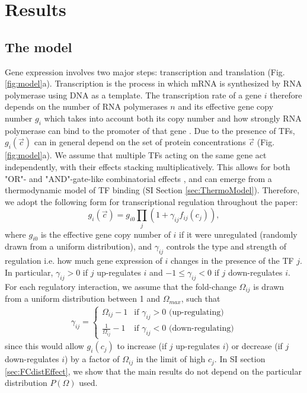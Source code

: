 \documentclass[10pt]{article}
\begin{document}
     

\section*{Results}

\subsection*{The model}
Gene expression involves two major steps: transcription and translation (Fig.\ref{fig:model}a). Transcription is the process in which mRNA is synthesized by RNA polymerase using DNA as a template. The transcription rate of a gene $i$ therefore depends on the number of RNA polymerases $n$ and its effective gene copy number $g_i$ which takes into account both its copy number and how strongly RNA polymerase can bind to the promoter of that gene \cite{lin2018homeostasis}. Due to the presence of TFs, $g_i(\vec{c})$ can in general depend on the set of protein concentrations $\vec{c}$ (Fig.\ref{fig:model}a). We assume that multiple TFs acting on the same gene act independently, with their effects stacking multiplicatively. This allows for both "OR"- and "AND"-gate-like combinatorial effects \cite{buchler2003schemes}, and can emerge from a thermodynamic model of TF binding (SI Section \ref{sec:ThermoModel}). Therefore, we adopt the following form for
transcriptional regulation throughout the paper:  
\begin{equation}
g_i(\vec{c}) = g_{i0} \prod_j (1 + \gamma_{ij} f_{ij}(c_j)),
\label{eqn:giexpression}
\end{equation}
where $g_{i0}$ is the effective gene copy number of $i$ if it were unregulated (randomly drawn from a uniform distribution), and $\gamma_{ij}$ controls the type and strength of regulation i.e. how much gene expression of $i$ changes in the presence of the TF $j$. In particular, $\gamma_{ij} > 0$ if $j$ up-regulates $i$ and $-1 \leq \gamma_{ij} < 0$ if $j$ down-regulates $i$. For each regulatory interaction, we assume that the fold-change $\Omega_{ij}$ is drawn from a uniform distribution between 1 and $\Omega_{max}$, such that 
\begin{align}
    \gamma_{ij} = \begin{cases}
    \Omega_{ij} - 1 & \text{if $\gamma_{ij} > 0$ (up-regulating)}
    \\
    \frac{1}{\Omega_{ij}} - 1 & \text{if $\gamma_{ij} < 0$ (down-regulating)}
    \end{cases}
    \label{eqn:gammadef}
\end{align}
since this would allow $g_i(c_j)$ to increase (if $j$ up-regulates $i$) or decrease (if $j$ down-regulates $i$) by a factor of $\Omega_{ij}$ in the limit of high $c_j$. In SI section \ref{sec:FCdistEffect}, we show that the main results do not depend on the particular distribution $P(\Omega)$ used. 
\end{document}

